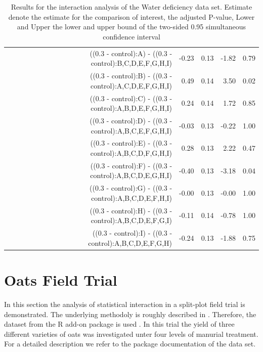 \documentclass[12pt]{article}\usepackage[]{graphicx}\usepackage[]{color}
\begin{document}
\begin{table}[ht]
{\begin{tabular}{rrrrr}
$$  ((0.3 - control):A) - ((0.3 - control):B,C,D,E,F,G,H,I) & -0.23 & 0.13 & -1.82 & 0.79 \\ 
  ((0.3 - control):B) - ((0.3 - control):A,C,D,E,F,G,H,I) & 0.49 & 0.14 & 3.50 & 0.02 \\ 
  ((0.3 - control):C) - ((0.3 - control):A,B,D,E,F,G,H,I) & 0.24 & 0.14 & 1.72 & 0.85 \\ 
  ((0.3 - control):D) - ((0.3 - control):A,B,C,E,F,G,H,I) & -0.03 & 0.13 & -0.22 & 1.00 \\ 
  ((0.3 - control):E) - ((0.3 - control):A,B,C,D,F,G,H,I) & 0.28 & 0.13 & 2.22 & 0.47 \\ 
  ((0.3 - control):F) - ((0.3 - control):A,B,C,D,E,G,H,I) & -0.40 & 0.13 & -3.18 & 0.04 \\ 
  ((0.3 - control):G) - ((0.3 - control):A,B,C,D,E,F,H,I) & -0.00 & 0.13 & -0.00 & 1.00 \\ 
  ((0.3 - control):H) - ((0.3 - control):A,B,C,D,E,F,G,I) & -0.11 & 0.14 & -0.78 & 1.00 \\ 
  ((0.3 - control):I) - ((0.3 - control):A,B,C,D,E,F,G,H) & -0.24 & 0.13 & -1.88 & 0.75 \\ 
   \hline
\end{tabular}
}
\caption{Results for the interaction analysis of the Water deficiency data set. Estimate denote the estimate for the comparison of interest, the adjusted P-value, Lower and Upper the lower and upper bound of the two-sided 0.95 simultaneous confidence interval} 
\end{table}





\newpage

\section{Oats Field Trial}
In this section the analysis of statistical interaction in a split-plot field trial is demonstrated. 
The underlying methodoly is roughly described in \cite{Kitsche.2014}.
Therefore, the \verb@oats@ dataset from the R add-on package \verb@MASS@ is used \citep{Venables2002}. In this trial the yield of three different varieties of oats was investigated unter four levels of manurial treatment. For a detailed description we refer to the \verb@MASS@ package documentation of the data set. 
\end{document}
